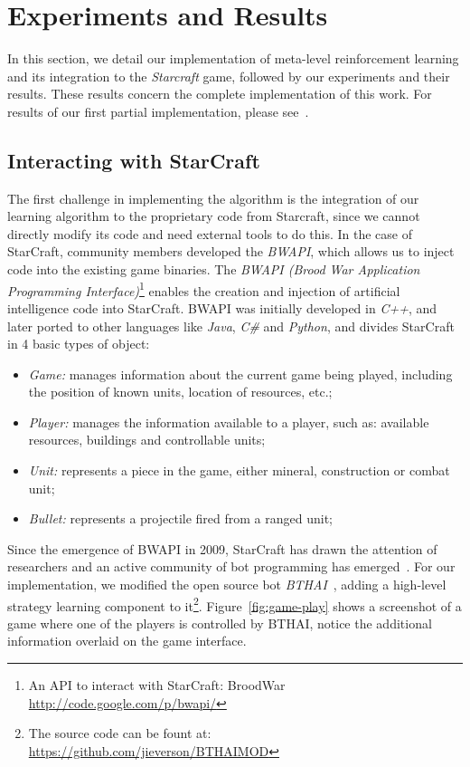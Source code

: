 \chapter{Experiments and Results}
\label{chapter:results}

In this section, we detail our implementation of meta-level reinforcement learning and its integration to the \emph{Starcraft} game, followed by our experiments and their results. 
These results concern the complete implementation of this work.
For results of our first partial implementation, please see~\cite{mypaper}.



\section{Interacting with StarCraft}
\label{sec:bwapi}

The first challenge in implementing the algorithm is the integration of our learning algorithm to the proprietary code from Starcraft, since we cannot directly modify its code and need external tools to do this. 
In the case of StarCraft, community members developed the \textit{BWAPI}, which allows us to inject code into the existing game binaries. 
The \textit{BWAPI (Brood War Application Programming Interface)}\footnote{An API to interact with StarCraft: BroodWar \url{http://code.google.com/p/bwapi/}} enables the creation and injection of artificial intelligence code into StarCraft. 
BWAPI was initially developed in \textit{C++}, and later ported to other languages like \textit{Java}, \textit{C\#} and \textit{Python}, and divides StarCraft in 4 basic types of object:


\begin{itemize}
\item \textit{Game:} manages information about the current game being played, 
including the position of known units, location of resources, etc.;
\item \textit{Player:} manages the information available to a player, such as: 
available resources, buildings and controllable units;
\item \textit{Unit:} represents a piece in the game, either mineral, construction or combat unit;
\item \textit{Bullet:} represents a projectile fired from a ranged unit;
\end{itemize}

Since the emergence of BWAPI in 2009, StarCraft has drawn the attention of researchers and an active community of bot programming has emerged~\cite{buro2012real}. 
For our implementation, we modified the open source bot \textit{BTHAI}~\cite{hagelback2012potential},
adding a high-level strategy learning component to it\footnote{The source code can be fount at: \url{https://github.com/jieverson/BTHAIMOD}}.
Figure~\ref{fig:game-play} shows a screenshot of a game where one of the players is controlled by BTHAI, notice the additional information overlaid on the game interface. 

